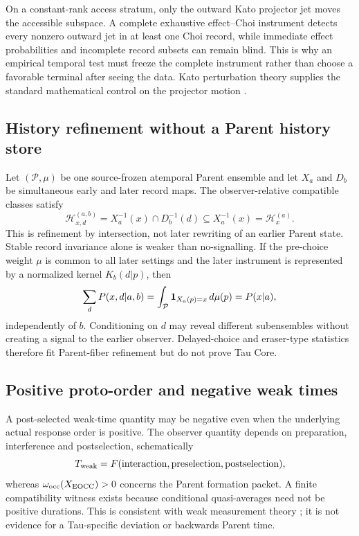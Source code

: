 \documentclass[11pt]{article}
\begin{document}
On a constant-rank access stratum, only the outward Kato projector jet moves
the accessible subspace.  A complete exhaustive effect--Choi instrument
detects every nonzero outward jet in at least one Choi record, while immediate
effect probabilities and incomplete record subsets can remain blind.  This
is why an empirical temporal test must freeze the complete instrument rather
than choose a favorable terminal after seeing the data.  Kato perturbation
theory supplies the standard mathematical control on the projector motion
\citep{Kato1995}.

\subsection{History refinement without a Parent history store}

Let \((\mathcal P,\mu)\) be one source-frozen atemporal Parent ensemble and
let \(X_a\) and \(D_b\) be simultaneous early and later record maps.  The
observer-relative compatible classes satisfy
\begin{equation}
 \mathcal H_{x,d}^{(a,b)}
 =X_a^{-1}(x)\cap D_b^{-1}(d)
 \subseteq X_a^{-1}(x)=\mathcal H_x^{(a)}.
 \label{eq:history-refinement}
\end{equation}
This is refinement by intersection, not later rewriting of an earlier Parent
state.  Stable record invariance alone is weaker than no-signalling.  If the
pre-choice weight \(\mu\) is common to all later settings and the later
instrument is represented by a normalized kernel \(K_b(d|p)\), then
\begin{equation}
 \sum_dP(x,d|a,b)
 =\int_{\mathcal P}{\bf1}_{X_a(p)=x}\,d\mu(p)
 =P(x|a),
 \label{eq:no-retro}
\end{equation}
independently of \(b\).  Conditioning on \(d\) may reveal different
subensembles without creating a signal to the earlier observer.  Delayed-choice
and eraser-type statistics therefore fit Parent-fiber refinement but do not
prove Tau Core.

\subsection{Positive proto-order and negative weak times}

A post-selected weak-time quantity may be negative even when the underlying
actual response order is positive.  The observer quantity depends on
preparation, interference and postselection, schematically
\begin{equation}
 T_{\rm weak}=F(\text{interaction},\text{preselection},\text{postselection}),
 \label{eq:weak-time}
\end{equation}
whereas \(\omega_{\rm occ}(X_{\rm EOCC})>0\) concerns the Parent formation
packet.  A finite compatibility witness exists because conditional
quasi-averages need not be positive durations.  This is consistent with weak
measurement theory \citep{Aharonov1988}; it is not evidence for a Tau-specific
deviation or backwards Parent time.
\end{document}
